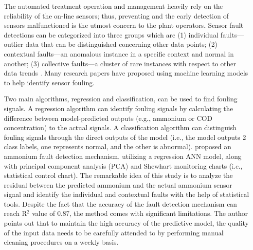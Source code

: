 The automated treatment operation and management heavily rely on the reliability of the on-line sensors; thus, preventing and the early detection of sensors malfunctioned is the utmost concern to the plant operators. Sensor fault detections can be categorized into three groups which are (1) individual faults--- outlier data that can be distinguished concerning other data points; (2) contextual faults---an anomalous instance in a specific context and normal in another; (3) collective faults---a cluster of rare instances with respect to other data trends \citep{chandolaAnomalyDetectionSurvey}. Many research papers have proposed using machine learning models to help identify sensor fouling.

Two main algorithms, regression and classification, can be used to find fouling signals. A regression algorithm can identify fouling signals by calculating the difference between model-predicted outputs (e.g., ammonium or COD concentration) to the actual signals. A classification algorithm can distinguish fouling signals through the direct outputs of the model (i.e., the model outputs 2 class labels, one represents normal, and the other is abnormal). \citet{cecconiSoftSensingOnLine2021} proposed an ammonium fault detection mechanism, utilizing a regression ANN model, along with principal component analysis (PCA) and Shewhart monitoring charts (i.e., statistical control chart). The remarkable idea of this study is to analyze the residual between the predicted ammonium and the actual ammonium sensor signal and identify the individual and contextual faults with the help of statistical tools. Despite the fact that the accuracy of the fault detection mechanism can reach R$^2$ value of 0.87, the method comes with significant limitations. The author points out that to maintain the high accuracy of the predictive model, the quality of the input data needs to be carefully attended to by performing manual cleaning procedures on a weekly basis. 

